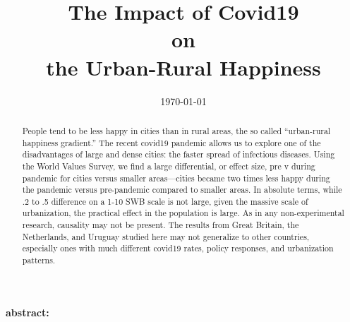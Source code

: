\documentclass[10pt, letterpaper]{article}
\date{{}\today \hspace{.2in}\xxivtime}
\title{  %
  The Impact of Covid19\\ on\\ the Urban-Rural Happiness %
}
\author{
}
\begin{document}


\maketitle
\vspace{-.4in}
\begin{center}

\end{center}

\textbf{abstract:}
\begin{abstract}
  \noindent People tend to be less happy in cities than in rural areas, the so called ``urban-rural happiness gradient.'' The recent covid19
  pandemic allows us to explore one of the  disadvantages of
  large and dense cities: the faster spread of infectious diseases.  Using the
  World Values Survey, we find a large differential, or effect size, pre v during pandemic for cities versus smaller areas---cities became two times less happy during the pandemic versus pre-pandemic compared to smaller areas. 
 In absolute terms, %
 while .2 to .5 difference on a 1-10 SWB scale is not large, given the massive scale of urbanization, the practical effect in the population is large. As in any
 non-experimental research, causality may not be present. The results from Great
 Britain, the Netherlands, and Uruguay studied here may not generalize to other
 countries, especially ones with much different covid19 rates, policy responses, 
 and urbanization patterns.
\end{abstract}
\vspace{.15in} 
\vspace{.25in} 
\end{document}
